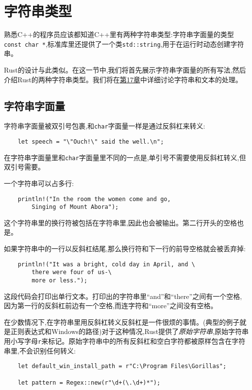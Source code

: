\section{字符串类型}\label{string}

熟悉C++的程序员应该都知道C++里有两种字符串类型:字符串字面量的类型\texttt{const char *},标准库里还提供了一个类\texttt{std::string},用于在运行时动态创建字符串。

Rust的设计与此类似。在这一节中,我们将首先展示字符串字面量的所有写法,然后介绍Rust的两种字符串类型。我们将在\hyperref[ch17]{第17章}中详细讨论字符串和文本的处理。

\subsection{字符串字面量}\label{StrLiteral}

字符串字面量被双引号包裹,和\texttt{char}字面量一样是通过反斜杠来转义:
\begin{verbatim}
    let speech = "\"Ouch!\" said the well.\n";
\end{verbatim}

在字符串字面量里和\texttt{char}字面量里不同的一点是,单引号不需要使用反斜杠转义,但双引号需要。

一个字符串可以占多行:
\begin{verbatim}
    println!("In the room the women come and go,
        Singing of Mount Abora");
\end{verbatim}
这个字符串里的换行符被包括在字符串里,因此也会被输出。第二行开头的空格也是。


如果字符串中的一行以反斜杠结尾,那么换行符和下一行的前导空格就会被丢弃掉:
\begin{verbatim}
    println!("It was a bright, cold day in April, and \
        there were four of us-\
        more or less.");
\end{verbatim}
这段代码会打印出单行文本。打印出的字符串里“and”和“there”之间有一个空格,因为第一行的反斜杠前边有一个空格,而连字符和“more”之间没有空格。

在少数情况下,在字符串里用反斜杠转义反斜杠是一件很烦的事情。(典型的例子就是正则表达式和Windows的路径)对于这种情况,Rust提供了\emph{原始字符串},原始字符串用小写字母\texttt{r}来标记。原始字符串中的所有反斜杠和空白字符都被原样包含在字符串里,不会识别任何转义:
\begin{verbatim}
    let default_win_install_path = r"C:\Program Files\Gorillas";

    let pattern = Regex::new(r"\d+(\.\d+)*");
\end{verbatim}

